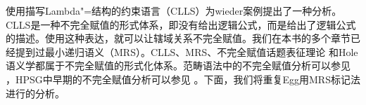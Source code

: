  \citet{Egg99a}使用描写Lambda"=结构的约束语言（CLLS）为wieder案例提出了一种分析。CLLS是一种不完全赋值的形式体系，即没有给出逻辑公式，而是给出了逻辑公式的描述。使用这种表达，就可以让辖域关系不完全赋值。我们在本书的多个章节已经提到过最小递归语义（MRS）\indexmrsc\citep*{CFPS2005a}。CLLS、MRS、不完全赋值话题表征理论  \citep{Reyle93b-u,FR95a-u}和Hole语义学\citep{Bos96a-u,BB2005a}都属于不完全赋值的形式化体系。范畴语法\indexcgc 中的不完全赋值分析可以参见  ，HPSG\indexhpsgc 中早期的不完全赋值分析可以参见 。下面，我们将重复Egg用MRS标记法进行的分析。

